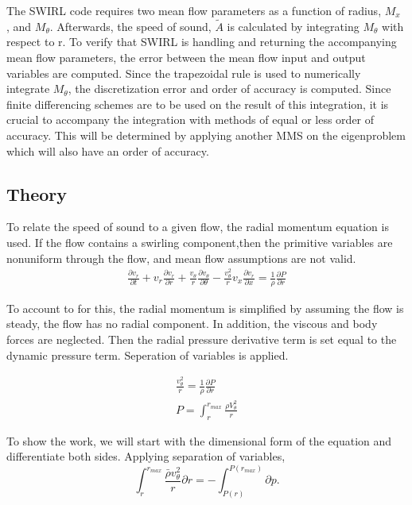 \documentclass[a4paper]{report}
\begin{document}
The SWIRL code requires two mean flow parameters as a function of radius, $M_x$
, and $M_{\theta}$. Afterwards, the speed of sound, $\widetilde{A}$ is calculated by 
integrating $M_{\theta}$ with respect to r. To verify that SWIRL is handling 
and returning the accompanying mean flow parameters, the error between the 
mean flow input and output variables are computed. Since the trapezoidal rule
is used to numerically integrate $M_{\theta}$, the discretization error and 
order of accuracy is computed. Since finite differencing schemes are to be used 
on the result of this integration, it is crucial to accompany the integration 
with methods of equal or less order of accuracy. This will be determined by 
applying another MMS on the eigenproblem which will also have an order of 
accuracy.

\subsection{Theory}

To relate the speed of sound to a given flow, the radial momentum equation
is used.  If the flow contains a swirling component,then the primitive variables 
are nonuniform through the flow, and mean flow assumptions are not valid. 
\begin{align*}
    \frac{\partial v_r}{\partial t} +
    v_r \frac{\partial v_r}{\partial r} + 
    \frac{v_{\theta}}{r} 
    \frac{\partial v_{\theta}}{\partial \theta} -
    \frac{v_{\theta}^2}{r} 
    v_x \frac{\partial v_r}{\partial x} =
    \frac{1}{\rho}\frac{\partial P}{\partial r}
\end{align*}

 To account to for this, the radial momentum is simplified by assuming the 
 flow is steady, the flow has no radial component. In addition, the viscous
 and body forces are neglected.  Then the radial pressure derivative term is
 set equal to the dynamic pressure term. Seperation of variables is applied.  

 \begin{align*}
     \frac{v_{\theta}^2}{r} = \frac{1}{\rho}\frac{\partial P}{\partial r} \\
 P = \int_{r}^{r_{max}} \frac{\rho V_{\theta}^2}{  r}
 \end{align*}

To show the work, we will start with the dimensional form of the equation and
differentiate both sides.  Applying separation of variables,
 \[
     \int_{r}^{r_{max}}
     \frac{\bar{\rho} v_{\theta}^2}{r} \partial r 
     =-\int_{P(r)}^{P(r_{max})}\partial p.
 \]
\end{document}
